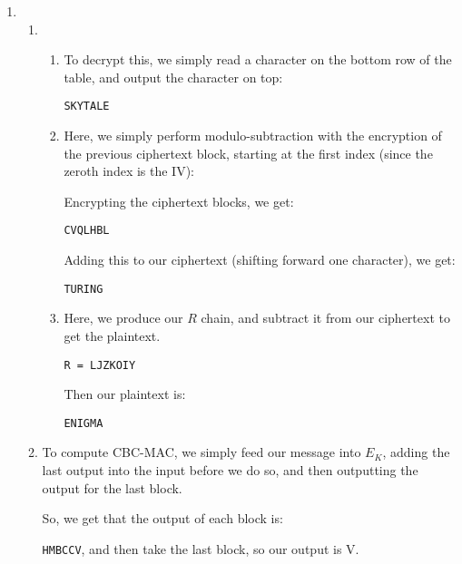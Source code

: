 


\begin{enumerate}[label=(\alph*)]

    \item
        \begin{enumerate}[label=(\roman*)]
            \item

                \begin{enumerate}[label=(\Alph*)]
                    \item
                    
                To decrypt this, we simply read a character on the bottom row of the table, and output the character on top:

                \texttt{SKYTALE}

            \item
                Here, we simply perform modulo-subtraction with the encryption of the previous ciphertext block, starting at the first index (since the zeroth index is the IV):

                Encrypting the ciphertext blocks, we get:

                \texttt{CVQLHBL}

                Adding this to our ciphertext (shifting forward one character), we get:

                \texttt{TURING}

            \item
                Here, we produce our $R$ chain, and subtract it from our ciphertext to get the plaintext.

                \texttt{R = LJZKOIY}

                Then our plaintext is:

                \texttt{ENIGMA}

                \end{enumerate}

            \item

                To compute CBC-MAC, we simply feed our message into $E_K$, adding the last output into the input before we do so, and then outputting the output for the last block.

                So, we get that the output of each block is:

                \texttt{HMBCCV}, and then take the last block, so our output is V.





\end{enumerate}
\end{enumerate}
